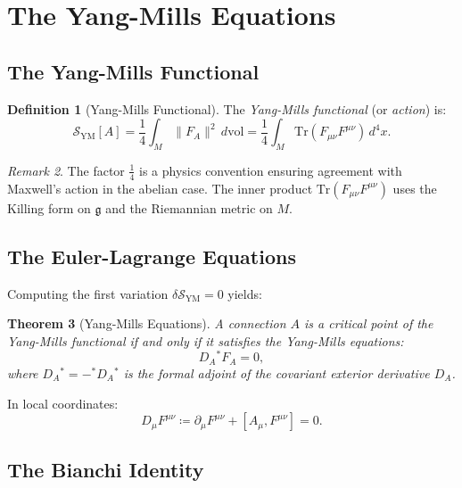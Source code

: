 \documentclass[12pt,a4paper]{amsart}
\newtheorem{theorem}{Theorem}[section]
\theoremstyle{definition}
\newtheorem{definition}[theorem]{Definition}
\theoremstyle{remark}
\newtheorem{remark}[theorem]{Remark}
\begin{document}
\section{The Yang-Mills Equations}
\label{sec:ym-eq}

\subsection{The Yang-Mills Functional}

\begin{definition}[Yang-Mills Functional]
The \emph{Yang-Mills functional} (or \emph{action}) is:
\[
  \mathcal{S}_{\mathrm{YM}}[A] = \frac{1}{4} \int_M \|F_A\|^2 \, d\mathrm{vol}
  = \frac{1}{4} \int_M \mathrm{Tr}(F_{\mu\nu} F^{\mu\nu}) \, d^4x.
\]
\end{definition}

\begin{remark}
The factor $\frac{1}{4}$ is a physics convention ensuring agreement with Maxwell's
action in the abelian case. The inner product $\mathrm{Tr}(F_{\mu\nu}F^{\mu\nu})$
uses the Killing form on $\mathfrak{g}$ and the Riemannian metric on $M$.
\end{remark}

\subsection{The Euler-Lagrange Equations}

Computing the first variation $\delta \mathcal{S}_{\mathrm{YM}} = 0$ yields:

\begin{theorem}[Yang-Mills Equations]
\label{thm:ym-equations}
A connection $A$ is a critical point of the Yang-Mills functional if and only if it
satisfies the \emph{Yang-Mills equations}:
\[
  D_A{}^* F_A = 0,
\]
where $D_A{}^* = -{}^* D_A {}^*$ is the formal adjoint of the covariant exterior
derivative $D_A$.
\end{theorem}

In local coordinates:
\[
  D_\mu F^{\mu\nu} \coloneqq \partial_\mu F^{\mu\nu} + [A_\mu, F^{\mu\nu}] = 0.
\]

\subsection{The Bianchi Identity}
\end{document}

